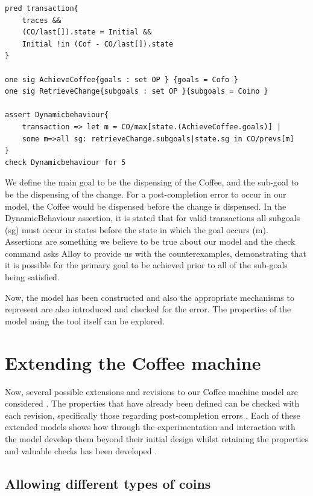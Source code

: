\documentclass[a4paper,12pt]{report}
\begin{document}
\begin{verbatim}
pred transaction{
	traces &&
	(CO/last[]).state = Initial &&
	Initial !in (Cof - CO/last[]).state
}

one sig AchieveCoffee{goals : set OP } {goals = Cofo }
one sig RetrieveChange{subgoals : set OP }{subgoals = Coino }

assert Dynamicbehaviour{
	transaction => let m = CO/max[state.(AchieveCoffee.goals)] |
	some m=>all sg: retrieveChange.subgoals|state.sg in CO/prevs[m]
}
check Dynamicbehaviour for 5

\end{verbatim}

We define the main goal to be the dispensing of the Coffee, and the sub-goal to be the dispensing of the change. For a post-completion error to occur in our model, the Coffee would be dispensed before the change is dispensed. In the DynamicBehaviour assertion, it is stated that for valid transactions all subgoals (sg) must occur in states before the state in which the goal occurs (m). Assertions are something we believe to be true about our model and the check command asks Alloy to provide us with the counterexamples, demonstrating that it is possible for the primary goal to be achieved prior to all of the sub-goals being satisfied.

Now, the model has been constructed and also the appropriate mechanisms to represent are also introduced and checked for the error. The properties of the model using the tool itself can be explored. 

\section{Extending the Coffee machine}
\label{Cofee machine ext}

Now, several possible extensions and revisions to our Coffee machine model are considered \cite{RussellBoyatt}. The properties that have already been defined can be checked with each revision, specifically those regarding post-completion errors \cite{RussellBoyatt}. Each of these extended models shows how through the experimentation and interaction with the model develop them beyond their initial design whilst retaining the properties and valuable checks has been developed \cite{RussellBoyatt}.

\subsection{Allowing different types of coins}
\label{Allowing different types coins}
\end{document}

